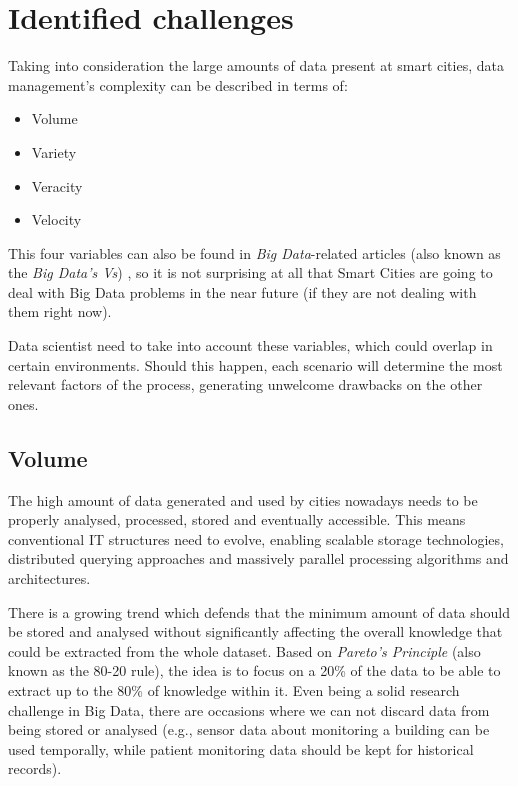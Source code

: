 \section{Identified challenges}

Taking into consideration the large amounts of data present at smart cities, data management's complexity can be described in terms of:
\begin{itemize}
	\item Volume
	\item Variety
	\item Veracity
	\item Velocity
\end{itemize}

This four variables can also be found in \textit{Big Data}-related articles (also known as the \textit{Big Data's Vs}) \cite{zikopoulos2011understanding,russom2011big}, so it is not surprising at all that Smart Cities are going to deal with Big Data problems in the near future (if they are not dealing with them right now).

Data scientist need to take into account these variables, which could overlap in certain environments. Should this happen, each scenario will determine the most relevant factors of the process, generating unwelcome drawbacks on the other ones.

\subsection{Volume}

The high amount of data generated and used by cities nowadays needs to be properly analysed, processed, stored and eventually accessible. This means conventional IT structures need to evolve, enabling scalable storage technologies, distributed querying approaches and massively parallel processing algorithms and architectures.

There is a growing trend which defends that the minimum amount of data should be stored and analysed without significantly affecting the overall knowledge that could be extracted from the whole dataset. Based on \textit{Pareto's Principle} (also known as the 80-20 rule), the idea is to focus on a 20\% of the data to be able to extract up to the 80\% of knowledge within it. Even being a solid research challenge in Big Data, there are occasions where we can not discard data from being stored or analysed (e.g., sensor data about monitoring a building can be used temporally, while patient monitoring data should be kept for historical records).

